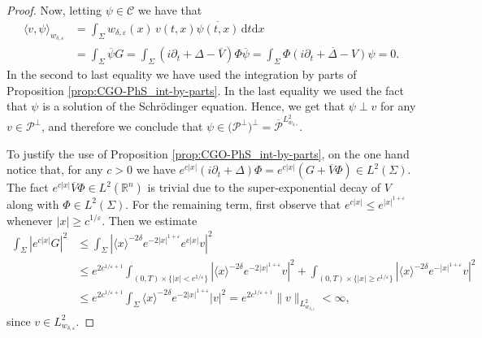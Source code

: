 \documentclass[10pt,a4paper]{amsart}
\theoremstyle{remark}
\theoremstyle{definition}
\newcommand{\R}{\mathbb{R}}
\newcommand{\dd}{\mathrm{d}}
\def\ve{\varepsilon}
\def\cal{\mathcal}
\def\ovl{\overline}
\def\d{\partial}
\begin{document}
\begin{proof}
%
Now, letting $\psi\in\mathcal C$ we have that
\begin{equation}\label{eq: int_by_parts}
%
\begin{aligned}
\langle v, \psi\rangle_{w_{\delta, \ve}} &= \int_\Sigma  w_{\delta,\ve}(x)\,v(t, x)\overline{\psi(t, x)}  \, \dd t  \dd x \\
%
&= \int_\Sigma \ovl{\psi} G = \int_\Sigma (i\d_t+\Delta - \ovl{V}) \Phi \ovl{\psi} 
= \int_\Sigma \Phi \ovl{(i\d_t+\Delta - V)\psi} = 0.
%
\end{aligned}
%
\end{equation}
%
In the second to last equality we have used the integration by parts of Proposition \ref{prop:CGO-PhS_int-by-parts}. In the last equality we used the fact that $\psi$ is a solution of the Schr\"odinger equation. Hence, we get that $\psi \perp v$
for any $v\in\cal{P}^{\perp}$, and therefore we conclude that $\psi\in \big(\mathcal P ^\perp)^\perp=\ovl{\cal{P}}^{L^2_{w_{\delta, \ve}}}$.
%

To justify the use of Proposition \ref{prop:CGO-PhS_int-by-parts}, on the one hand notice that, for any $c>0$ we have $e^{c|x|}(i\partial_t+\Delta)\Phi =e^{c|x|} (G+\overline V \Phi) \in L^2(\Sigma)$. The fact $e^{c|x|}\ovl{V} \Phi \in L^2(\R^n)$ is trivial due to  the super-exponential decay of $V$ along with $\Phi\in L^2(\Sigma)$. For the remaining term, first observe that $e^{c|x|} \leq e^{|x|^{1+\ve}}$ whenever $|x|\geq c^{1/\ve}$. Then we estimate 
%
\begin{align*}
\int_{\Sigma} |e^{c|x|} G|^2 &\leq \int_\Sigma |\langle x\rangle^{-2\delta} e^{-2|x|^{1+\ve}} e^{c|x|}v |^2 \\
%
&\leq e^{2c^{1/\ve +1 }} \int_{(0, T)\times \{ |x| < c^{1/\ve} \}} | \langle x\rangle^{-2\delta} e^{-2|x|^{1+\ve}} v|^2 
+ \int_{(0, T)\times \{ |x| \geq c^{1/\ve}\}} |\langle x \rangle^{-2\delta} e^{-|x|^{1+\ve}} v|^2 \\
%
&\leq e^{2c^{1/\ve +1 }} \int_\Sigma \langle x \rangle^{-2\delta} e^{-2|x|^{1+\ve}} |v|^2 
= e^{2c^{1/\ve +1 }} \|v\|_{L^2_{w_{\delta, \ve}}} <\infty,
\end{align*}
%
since  $v \in L^2_{w_{\delta, \ve}}$.



\end{proof}
\end{document}
